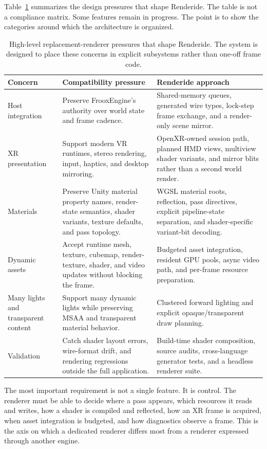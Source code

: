 \documentclass[acmtog,screen,nonacm]{acmart}
\begin{document}
Table~\ref{tab:requirements} summarizes the design pressures that shape Renderide. The table is not a compliance matrix. Some features remain in progress. The point is to show the categories around which the architecture is organized.

\begin{table}
\caption{High-level replacement-renderer pressures that shape Renderide. The system is designed to place these concerns in explicit subsystems rather than one-off frame code.}
\label{tab:requirements}
\centering
\begin{tabular}{p{}p{}p{}}
\toprule
Concern & Compatibility pressure & Renderide approach \\
\midrule
Host integration & Preserve FrooxEngine's authority over world state and frame cadence. & Shared-memory queues, generated wire types, lock-step frame exchange, and a render-only scene mirror. \\
XR presentation & Support modern VR runtimes, stereo rendering, input, haptics, and desktop mirroring. & OpenXR-owned session path, planned HMD views, multiview shader variants, and mirror blits rather than a second world render. \\
Materials & Preserve Unity material property names, render-state semantics, shader variants, texture defaults, and pass topology. & WGSL material roots, reflection, pass directives, explicit pipeline-state separation, and shader-specific variant-bit decoding. \\
Dynamic assets & Accept runtime mesh, texture, cubemap, render-texture, shader, and video updates without blocking the frame. & Budgeted asset integration, resident GPU pools, async video path, and per-frame resource preparation. \\
Many lights and transparent content & Support many dynamic lights while preserving MSAA and transparent material behavior. & Clustered forward lighting and explicit opaque/transparent draw planning. \\
Validation & Catch shader layout errors, wire-format drift, and rendering regressions outside the full application. & Build-time shader composition, source audits, cross-language generator tests, and a headless renderer suite. \\
\bottomrule
\end{tabular}
\end{table}

The most important requirement is not a single feature. It is control. The renderer must be able to decide where a pass appears, which resources it reads and writes, how a shader is compiled and reflected, how an XR frame is acquired, when asset integration is budgeted, and how diagnostics observe a frame. This is the axis on which a dedicated renderer differs most from a renderer expressed through another engine.
\end{document}
